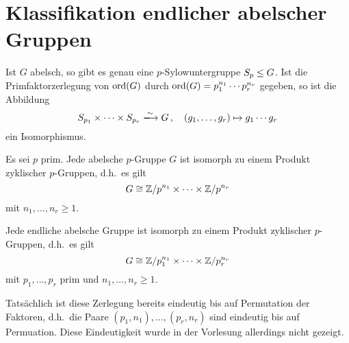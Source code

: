 \section{Klassifikation endlicher abelscher Gruppen}

\begin{theorem}
  Ist $G$ abelsch, so gibt es genau eine $p$-Sylowuntergruppe $S_p \mathrel{\leq} G$.
  Ist die Primfaktorzerlegung von $\operatorname{ord}(G)$ durch $\operatorname{ord}(G) = p_1^{n_1} \dotsm p_r^{n_r}$ gegeben, so ist die Abbildung
  \[
                            S_{p_1} \times \dotsb \times S_{p_r}
    \xlongrightarrow{\sim}  G \,,
    \quad                   (g_1, \dotsc, g_r)
    \mapsto                 g_1 \dotsm g_r
  \]
  ein Isomorphismus.
\end{theorem}

\begin{proposition}
  Es sei $p$ prim.
  Jede abelsche $p$-Gruppe $G$ ist isomorph zu einem Produkt zyklischer $p$-Gruppen, d.h.\ es gilt
  \[
          G
    \cong \mathbb{Z}/p^{n_1} \times \dotsm \times \mathbb{Z}/p^{n_r}
  \]
  mit $n_1, \dotsc, n_r \geq 1$.
\end{proposition}

\begin{corollary}
  Jede endliche abelsche Gruppe ist isomorph zu einem Produkt zyklischer $p$-Gruppen, d.h.\ es gilt
  \[
          G
    \cong \mathbb{Z}/p_1^{n_1} \times \dotsm \times \mathbb{Z}/p_r^{n_r}
  \]
  mit $p_1, \dotsc, p_r$ prim und $n_1, \dotsc, n_r \geq 1$.
\end{corollary}

\begin{remark}
  Tatsächlich ist diese Zerlegung bereits eindeutig bis auf Permutation der Faktoren, d.h.\ die Paare $(p_1, n_1), \dotsc, (p_r, n_r)$ sind eindeutig bis auf Permuation.
  Diese Eindeutigkeit wurde in der Vorlesung allerdings nicht gezeigt.
\end{remark}




